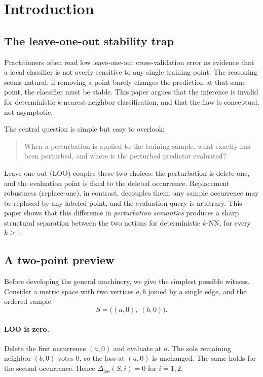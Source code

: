 \section{Introduction}
\label{sec:introduction}

\subsection{The leave-one-out stability trap}

Practitioners often read low leave-one-out cross-validation error as evidence
that a local classifier is not overly sensitive to any single training point.
The reasoning seems natural: if removing a point barely changes the prediction
at that same point, the classifier must be stable.  This paper argues that the
inference is invalid for deterministic $k$-nearest-neighbor classification, and
that the flaw is conceptual, not asymptotic.

The central question is simple but easy to overlook:

\begin{quote}
When a perturbation is applied to the training sample, what exactly has been
perturbed, and where is the perturbed predictor evaluated?
\end{quote}

Leave-one-out (LOO) couples these two choices: the perturbation is delete-one,
and the evaluation point is fixed to the deleted occurrence.  Replacement
robustness (replace-one), in contrast, decouples them: any sample occurrence
may be replaced by any labeled point, and the evaluation query is arbitrary.
This paper shows that this difference in \emph{perturbation semantics} produces
a sharp structural separation between the two notions for deterministic $k$-NN,
for every $k \ge 1$.

\subsection{A two-point preview}

Before developing the general machinery, we give the simplest possible witness.
Consider a metric space with two vertices $a,b$ joined by a single edge, and
the ordered sample
\[
S = \big((a,0),\;(b,0)\big).
\]

\paragraph{LOO is zero.}
Delete the first occurrence $(a,0)$ and evaluate at $a$.  The sole remaining
neighbor $(b,0)$ votes $0$, so the loss at $(a,0)$ is unchanged.  The same
holds for the second occurrence.  Hence $\Delta_{\mathrm{loo}}(S,i)=0$ for
$i=1,2$.

